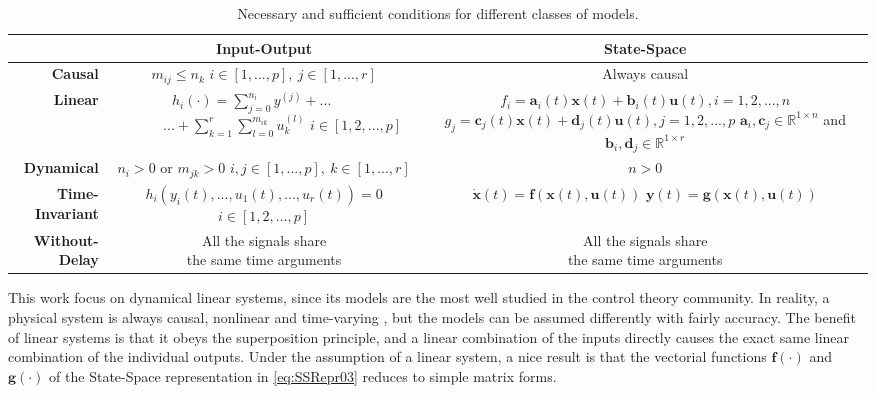 \documentclass[a4paper,11pt]{book}
\numberwithin{figure}{chapter}
\numberwithin{equation}{chapter}
\numberwithin{table}{chapter}
\theoremstyle{definition}
\begin{document}
\begin{table}[!ht]
    \centering
    \begin{tabular}{r | c | c }
     & \textbf{Input-Output} & \textbf{State-Space} \\
    \hline 
        \textbf{Causal}         & \makecell{$m_{ij} \leq n_k$\\$i \in [1,..., p],\ j \in [1,...,r]$} & Always causal \\
    \hline 
        \textbf{Linear}         & \makecell{$h_i(\cdot) = \sum_{j=0}^{n_i} y^{(j)} + ... \ \ \ \ \ \ \ \ $\\$ \ \ \ \ \ \ \ \ \ \ \ \ ... + \sum_{k=1}^{r} \sum_{l=0}^{m_{ik}} u_k^{(l)}$\\$i \in [1,2,...,p]$} & \makecell{$f_i = \bm{a}_i(t) \bm{x}(t) + \bm{b}_i(t) \bm{u}(t), i = 1,2,...,n$ \\ $g_j = \bm{c}_j(t) \bm{x}(t) + \bm{d}_j(t) \bm{u}(t), j = 1,2,...,p$ \\ $\bm{a}_i,\bm{c}_j \in \mathbb{R}^{1 \times n}$ and $\bm{b}_i, \bm{d}_j \in \mathbb{R}^{1 \times r}$} \\
    \hline 
        \textbf{Dynamical}      & \makecell{$n_i > 0$ or $m_{jk} > 0$\\$i, j \in [1,...,p],\ k \in [1,...,r]$} & $n > 0$ \\
    \hline 
        \textbf{Time-Invariant} & \makecell{$h_i(y_i(t),...,u_1(t),...,u_r(t)) = 0$\\$i \in  [1,2,...,p]$} & \makecell{$\dot{\bm{x}}(t) = \bm{f}(\bm{x}(t), \bm{u}(t))$ \\ $\bm{y}(t) = \bm{g}(\bm{x}(t), \bm{u}(t))$} \\
    \hline 
        \textbf{Without-Delay}  & \makecell{All the signals share\\the same time arguments} & \makecell{All the signals share\\the same time arguments} \\
    \end{tabular} 
    \caption{Necessary and sufficient conditions for different classes of models.}
    \label{table:classes01} 
\end{table} 

This work focus on dynamical linear systems, since its models are the most well studied in the control theory community. In reality, a physical system is always causal, nonlinear and time-varying \cite{Vidyasagar:2002}, but the models can be assumed differently with fairly accuracy. The benefit of linear systems is that it obeys the superposition principle, and a linear combination of the inputs directly causes the exact same linear combination of the individual outputs. Under the assumption of a linear system, a nice result is that the vectorial functions $\bm{f}(\cdot)$ and $\bm{g}(\cdot)$ of the State-Space representation in \eqref{eq:SSRepr03} reduces to simple matrix forms.
\end{document}
